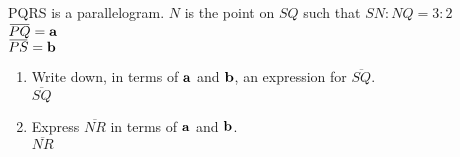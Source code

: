 \begin{enumerate}
\begin{figure}[H]
  \end{figure}
  PQRS is a parallelogram. $N$ is the point on $SQ$ such that $SN : NQ = 3 : 2$\\
  $\overbar{PQ} = \vb{a}$\\
  $\overbar{PS} = \vb{b}$
  \begin{enumerate}
    \item Write down, in terms of $\vb{a}$ and $\vb{b}$, an expression for $\overbar{SQ}$.\\[2cm]\vspace*{0pt}\hfill$\overbar{SQ}$\dline
    \item Express $\overbar{NR}$ in terms of $\vb{a}$ and $\vb{b}$.\\[3cm]\vspace*{0pt}\hfill$\overbar{NR}$\dline
  \end{enumerate}


\end{enumerate}